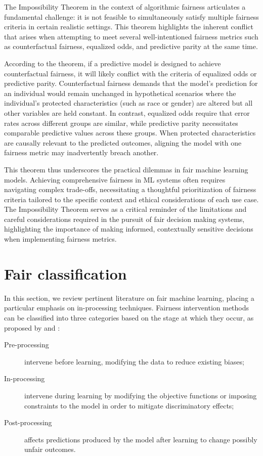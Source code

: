 The Impossibility Theorem in the context of algorithmic fairness articulates a fundamental challenge: it is not feasible to simultaneously satisfy multiple fairness criteria in certain realistic settings. This theorem highlights the inherent conflict that arises when attempting to meet several well-intentioned fairness metrics such as counterfactual fairness, equalized odds, and predictive parity at the same time.

According to the theorem, if a predictive model is designed to achieve counterfactual fairness, it will likely conflict with the criteria of equalized odds or predictive parity. Counterfactual fairness demands that the model's prediction for an individual would remain unchanged in hypothetical scenarios where the individual's protected characteristics (such as race or gender) are altered but all other variables are held constant. In contrast, equalized odds require that error rates across different groups are similar, while predictive parity necessitates comparable predictive values across these groups. When protected characteristics are causally relevant to the predicted outcomes, aligning the model with one fairness metric may inadvertently breach another.

This theorem thus underscores the practical dilemmas in fair machine learning models. Achieving comprehensive fairness in ML systems often requires navigating complex trade-offs, necessitating a thoughtful prioritization of fairness criteria tailored to the specific context and ethical considerations of each use case. The Impossibility Theorem serves as a critical reminder of the limitations and careful considerations required in the pursuit of fair decision making systems, highlighting the importance of making informed, contextually sensitive decisions when implementing fairness metrics.

\section{Fair classification}

In this section, we review pertinent literature on fair machine learning, placing a particular emphasis on in-processing techniques. Fairness intervention methods can be classified into three categories based on the stage at which they occur, as proposed by \cite{Mehrabi2019} and \cite{AlerTubella2022}:

\begin{description}
    \item[Pre-processing] intervene before learning, modifying the data to reduce existing biases;
    \item[In-processing] intervene during learning by modifying the objective functions or imposing constraints to the model in order to mitigate discriminatory effects;
    \item[Post-processing] affects predictions produced by the model after learning to change possibly unfair outcomes. 
\end{description}

